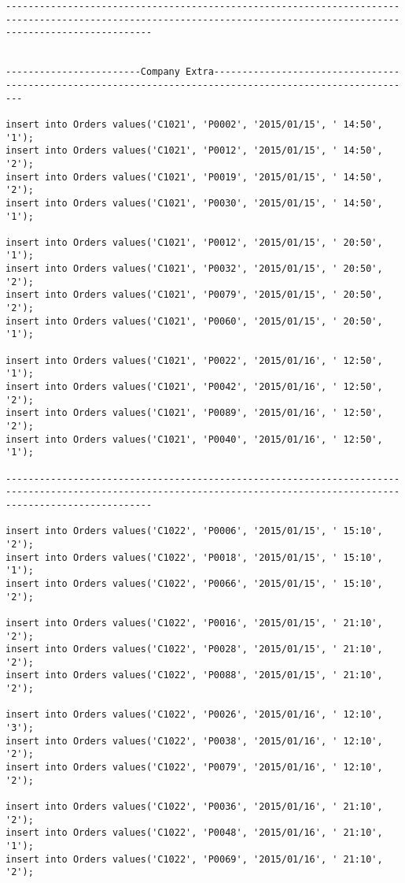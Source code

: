 \documentclass[a4,12pt]{report}
\begin{document}
\begin{lstlisting}
----------------------------------------------------------------------------------------------------------------------------------------------------------------------


------------------------Company Extra----------------------------------------------------------------------------------------------------------

insert into Orders values('C1021', 'P0002', '2015/01/15', ' 14:50', '1');
insert into Orders values('C1021', 'P0012', '2015/01/15', ' 14:50', '2');
insert into Orders values('C1021', 'P0019', '2015/01/15', ' 14:50', '2');
insert into Orders values('C1021', 'P0030', '2015/01/15', ' 14:50', '1');

insert into Orders values('C1021', 'P0012', '2015/01/15', ' 20:50', '1');
insert into Orders values('C1021', 'P0032', '2015/01/15', ' 20:50', '2');
insert into Orders values('C1021', 'P0079', '2015/01/15', ' 20:50', '2');
insert into Orders values('C1021', 'P0060', '2015/01/15', ' 20:50', '1');

insert into Orders values('C1021', 'P0022', '2015/01/16', ' 12:50', '1');
insert into Orders values('C1021', 'P0042', '2015/01/16', ' 12:50', '2');
insert into Orders values('C1021', 'P0089', '2015/01/16', ' 12:50', '2');
insert into Orders values('C1021', 'P0040', '2015/01/16', ' 12:50', '1');

----------------------------------------------------------------------------------------------------------------------------------------------------------------------

insert into Orders values('C1022', 'P0006', '2015/01/15', ' 15:10', '2');
insert into Orders values('C1022', 'P0018', '2015/01/15', ' 15:10', '1');
insert into Orders values('C1022', 'P0066', '2015/01/15', ' 15:10', '2');

insert into Orders values('C1022', 'P0016', '2015/01/15', ' 21:10', '2');
insert into Orders values('C1022', 'P0028', '2015/01/15', ' 21:10', '2');
insert into Orders values('C1022', 'P0088', '2015/01/15', ' 21:10', '2');

insert into Orders values('C1022', 'P0026', '2015/01/16', ' 12:10', '3');
insert into Orders values('C1022', 'P0038', '2015/01/16', ' 12:10', '2');
insert into Orders values('C1022', 'P0079', '2015/01/16', ' 12:10', '2');

insert into Orders values('C1022', 'P0036', '2015/01/16', ' 21:10', '2');
insert into Orders values('C1022', 'P0048', '2015/01/16', ' 21:10', '1');
insert into Orders values('C1022', 'P0069', '2015/01/16', ' 21:10', '2');


\end{lstlisting}
\end{document}
